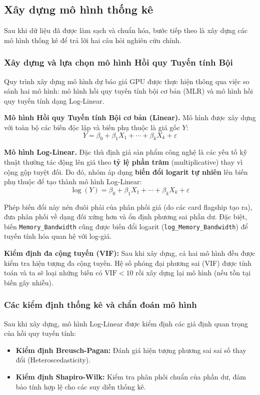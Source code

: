 \subsection{Xây dựng mô hình thống kê}

Sau khi dữ liệu đã được làm sạch và chuẩn hóa, bước tiếp theo là xây dựng các mô hình thống kê để trả lời hai câu hỏi nghiên cứu chính.

\subsubsection{Xây dựng và lựa chọn mô hình Hồi quy Tuyến tính Bội}

Quy trình xây dựng mô hình dự báo giá GPU được thực hiện thông qua việc so sánh hai mô hình: mô hình hồi quy tuyến tính bội cơ bản (MLR) và mô hình hồi quy tuyến tính dạng Log-Linear.

\textbf{Mô hình Hồi quy Tuyến tính Bội cơ bản (Linear).} Mô hình được xây dựng với toàn bộ các biến độc lập và biến phụ thuộc là giá gốc $Y$:
\[
  Y = \beta_0 + \beta_1 X_1 + \cdots + \beta_k X_k + \varepsilon
\]

\textbf{Mô hình Log-Linear.} Đặc thù định giá sản phẩm công nghệ là các yếu tố kỹ thuật thường tác động lên giá theo \textbf{tỷ lệ phần trăm} (multiplicative) thay vì cộng gộp tuyệt đối. Do đó, nhóm áp dụng \textbf{biến đổi logarit tự nhiên} lên biến phụ thuộc để tạo thành mô hình Log-Linear:
\[
  \log(Y) = \beta_0 + \beta_1 X_1 + \cdots + \beta_k X_k + \varepsilon
\]

Phép biến đổi này nén đuôi phải của phân phối giá (do các card flagship tạo ra), đưa phân phối về dạng đối xứng hơn và ổn định phương sai phần dư. Đặc biệt, biến \texttt{Memory\_Bandwidth} cũng được biến đổi logarit (\texttt{log\_Memory\_Bandwidth}) để tuyến tính hóa quan hệ với log-giá.

\textbf{Kiểm định đa cộng tuyến (VIF):} Sau khi xây dựng, cả hai mô hình đều được kiểm tra hiện tượng đa cộng tuyến. Hệ số phóng đại phương sai (VIF) được tính toán và ta sẽ loại những biến có $\text{VIF} < 10$ rồi xây dựng lại mô hình (nếu tồn tại biến gây nhiễu).

\subsubsection{Các kiểm định thống kê và chẩn đoán mô hình}

Sau khi xây dựng, mô hình Log-Linear được kiểm định các giả định quan trọng của hồi quy tuyến tính:
\begin{itemize}
    \item \textbf{Kiểm định Breusch-Pagan:} Đánh giá hiện tượng phương sai sai số thay đổi (Heteroscedasticity).
    \item \textbf{Kiểm định Shapiro-Wilk:} Kiểm tra phân phối chuẩn của phần dư, đảm bảo tính hợp lệ cho các suy diễn thống kê.
\end{itemize}

